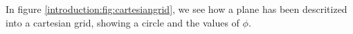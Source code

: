In figure \vref{introduction:fig:cartesiangrid}, we see how a plane
has been descritized into a cartesian grid, showing a circle and the
values of $\phi$.

\pagebreak











